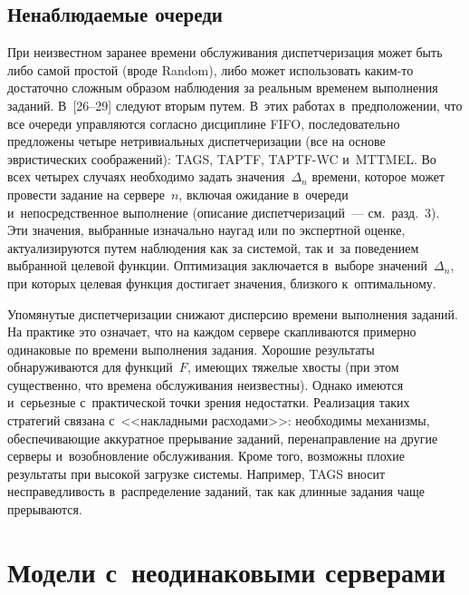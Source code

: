 \begin{multicols}{2}
\vspace*{-1pt}
   
   \subsection{Ненаблюдаемые очереди}
   
   \vspace*{-1pt}
   
    При неизвестном заранее времени обслуживания диспетчеризация может быть либо 
самой простой (вроде Random), либо может использовать каким-то достаточно сложным 
образом наблюдения за реальным временем выполнения заданий. В~[26--29] 
следуют вторым путем. В~этих работах в~предположении, что все очереди 
управляются согласно дисциплине FIFO, последовательно предложены четыре 
нетривиальных диспетчеризации (все на основе эвристических соображений): TAGS, 
TAPTF, TAPTF-WC и~MTTMEL. Во всех четырех случаях необходимо задать 
значения~$\Delta_n$ времени, которое может провести задание на сервере~$n$, включая 
ожидание в~очереди и~непосредственное выполнение (описание диспетчеризаций~--- 
см.\ разд.~3). Эти значения, выбранные изначально наугад или по экспертной оценке, 
актуализируются путем наблюдения как за системой, так и~за поведением выбранной 
целевой функции. Оптимизация заключается в~выборе значений~$\Delta_n$, при которых 
целевая функция достигает значения, близкого к~оптимальному.
    
    Упомянутые диспетчеризации снижают дис\-пер\-сию времени выполнения заданий. На 
практике это означает, что на каждом сервере скапливаются примерно одинаковые по 
времени выполнения задания. Хорошие результаты обнаруживаются для функций~$F$, 
имеющих тяжелые хвосты (при этом существенно, что времена обслуживания 
неизвестны). Однако имеются и~серьезные с~практической точки зрения недостатки. 
Реализация таких стратегий связана с~<<накладными расходами>>: необходимы механизмы, 
обеспечивающие аккуратное прерывание заданий, перенаправление на другие серверы 
и~возобновление обслуживания. Кроме того, возможны плохие результаты при высокой 
загрузке системы. Например, TAGS вносит несправедливость в~распределение заданий, 
так как длинные задания чаще прерываются.

\vspace*{-2pt}

\section{Модели с~неодинаковыми серверами}


\end{multicols}

